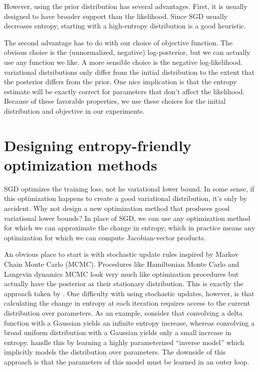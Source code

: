 \documentclass[]{article}
\begin{document}
However, using the prior distribution has several advantages.
First, it is usually designed to have broader support than the likelihood.
Since SGD usually decreases entropy, starting with a high-entropy distribution
is a good heuristic.

The second advantage has to do with our choice of objective function.
The obvious choice is the (unnormalized, negative) log-posterior, but we can actually use any function we like.
A more sensible choice is the negative log-likelihood.
variational distributions only differ from the
initial distribution to the extent that the posterior differs from the prior.
One nice implication is that the entropy estimate will be exactly correct for parameters that don't affect the likelihood.
Because of these favorable properties, we use these choices for the initial distribution and objective in our experiments.

\section{Designing entropy-friendly optimization methods}
\label{sec:entropy friendly}
SGD optimizes the training loss, not he variational lower bound.
In some sense, if this optimization happens to create a good variational distribution, it's only by accident.
Why not design a new optimization method that produces good variational lower bounds?
In place of SGD, we can use any optimization method for which we can approximate the change in entropy, which in practice means any optimization for which we can compute Jacobian-vector products.

An obvious place to start is with stochastic update rules inspired by Markov Chain Monte Carlo (MCMC). 
Procedures like Hamiltonian Monte Carlo \citep{neal2011mcmc} and Langevin dynamics MCMC \citep{welling2011bayesian} look very much like optimization procedures but actually have the posterior as their stationary distribution.
This is exactly the approach taken by \citet{Bridging14}.
One difficulty with using stochastic updates, however, is that calculating the change in
entropy at each iteration requires access to the current distribution over parameters.
As an example, consider that convolving a delta function with a Gaussian yields an
infinite entropy increase, whereas convolving a broad uniform distribution with a Gaussian
yields only a small increase in entropy. \citet{welling2011bayesian} handle this
by learning a highly parameterized ``inverse model'' which implicitly models the distribution
over parameters. The downside of this approach is that the parameters of this model must be learned in an outer loop.
\end{document}
